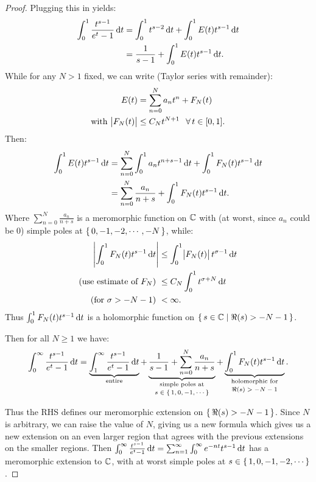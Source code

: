 \begin{proof}
Plugging this in yields:
\begin{align*}
    \int_0^1 \frac{t^{s-1}}{e^t - 1}  \dif t &= \int_0^1 t^{s-2} \dif t + \int_0^1 E(t) t^{s-1}  \dif t\\
    &= \frac{1}{s-1} + \int_0^1 E(t) t^{s-1}  \dif t.
\end{align*}
While for any $N > 1$ fixed, we can write (Taylor series with remainder):
\begin{align*}
    E(t) &= \sum_{n=0}^N a_n t^n + F_N(t)\\
    \text{with } \abs{F_N(t)} &\leq C_N t^{N+1} \;\;\, \forall \, t \in [0,1].
\end{align*}
Then:
\begin{align*}
    \int_0^1 E(t) t^{s-1}  \dif t &= \sum_{n=0}^N \int_0^1 a_n t^{n+s-1} \dif t + \int_0^1 F_N(t) t^{s-1} \dif t\\
    &= \sum_{n=0}^N \frac{a_n}{n+s} + \int_0^1 F_N(t) t^{s-1} \dif t.
\end{align*}
Where $\sum_{n=0}^N \frac{a_n}{n+s}$ is a meromorphic function on $\mathbb{C}$ with (at worst, since $a_n$ could be $0$) simple poles at $\set{0,-1,-2, \cdots ,-N}$, while:
\begin{align*}
    \abs{\int_0^1 F_N(t) t^{s-1} \dif t} &\leq \int_0^1 \abs{F_N(t)} t^{\sigma-1} \dif t\\
    \text{(use estimate of $F_N$) }&\leq C_N \int_0^1 t^{\sigma+N} \dif t\\
    \text{(for $\sigma > -N-1$) }&< \infty.
\end{align*}
Thus $\int_0^1 F_N(t) t^{s-1} \dif t$ is a holomorphic function on $\set{s \in \mathbb{C}\mid \Re(s) > -N - 1}$.

Then for all $N \geq 1$ we have:
\begin{align}\label{eq:r-split-integral}
    \int_0^\infty \frac{t^{s-1}}{e^t - 1}  \dif t =  \underbrace{\int_1^\infty \frac{t^{s-1}}{e^t - 1}  \dif t}_{\text{entire}} + \underbrace{\frac{1}{s-1} + \sum_{n=0}^N \frac{a_n}{n+s}}_{\text{\stackanchor{simple poles at}{$s \in \set{1,0, -1, \cdots}$}}} + \underbrace{\int_0^1 F_N(t) t^{s-1} \dif t}_{\text{\stackanchor{holomorphic for}{$\Re(s) > -N -1$}}}.
\end{align}

Thus the RHS defines our meromorphic extension on $\set{\Re(s) > -N - 1}$. Since $N$ is arbitrary, we can raise the value of $N$, giving us a new formula which gives us a new extension on an even larger region that agrees with the previous extensions on the smaller regions. Then $\int_0^\infty \frac{t^{s-1}}{e^t - 1}  \dif t = \sum_{n=1}^\infty \int_0^\infty e^{-nt} t^{s-1} \dif t$ has a meromorphic extension to $\mathbb{C}$, with at worst simple poles at $s \in \set{1,0,-1,-2, \cdots}$.


\end{proof}
